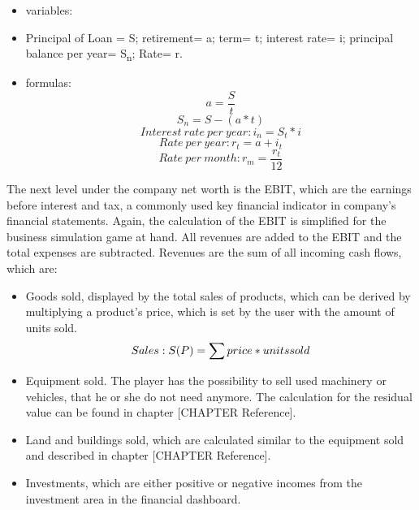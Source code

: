 \begin{itemize}
    \item variables:
    \item Principal of Loan = S; retirement= a; term= t; interest rate= i; principal balance per year= S\textsubscript{n}; Rate= r. 
    \item formulas:
 $$a={\dfrac{S}{t}}$$
 $$S_n=S-(a*t)$$
 $$Interest\ rate\ per\ year: i_n=S_t*i $$
 $$Rate\ per\ year: r_t=a+i_t$$
$$Rate\ per\ month:r_m= {\dfrac{r_t}{12}} $$
    
\end{itemize}

The next level under the company net worth is the EBIT, which are the earnings before interest and tax, a commonly used key financial indicator in company's financial statements. \cite{lee_e_2006} Again, the calculation of the EBIT is simplified for the business simulation game at hand. All revenues are added to the EBIT and the total expenses are subtracted. Revenues are the sum of all incoming cash flows, which are:
\begin{itemize}
    \item Goods sold, displayed by the total sales of products, which can be derived by multiplying a product’s price, which is set by the user with the amount of units sold.
    \begin{equation}
        Sales: S(P) = \sum price\index{Product} * units sold
    \end{equation}
    \item Equipment sold. The player has the possibility to sell used machinery or vehicles, that he or she do not need anymore. The calculation for the residual value can be found in chapter [CHAPTER Reference].
    \item Land and buildings sold, which are calculated similar to the equipment sold and described in chapter [CHAPTER Reference].
    \item Investments, which are either positive or negative incomes from the investment area in the financial dashboard.
\end{itemize}

